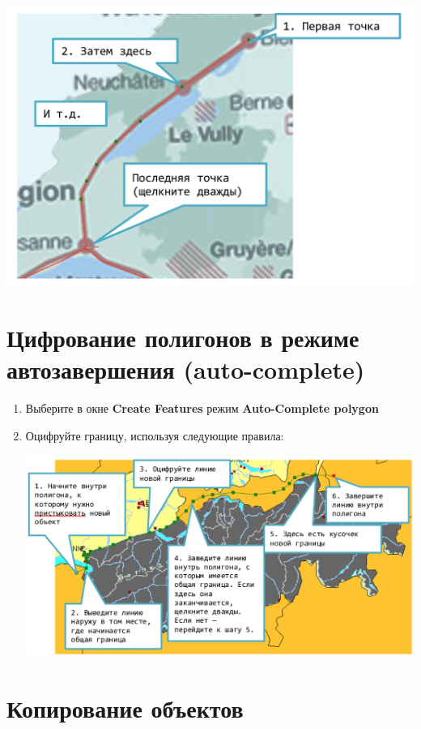 \documentclass[12pt,]{book}
\begin{document}
\begin{enumerate}
  \includegraphics{images/Appendix/image92.png}
\end{enumerate}

\hypertarget{manual-edit-complete}{%
\section{Цифрование полигонов в режиме автозавершения (auto-complete)}\label{manual-edit-complete}}

\begin{enumerate}
\def\labelenumi{\arabic{enumi}.}
\item
  Выберите в окне \textbf{Create Features} режим \textbf{Auto-Complete polygon}
\item
  Оцифруйте границу, используя следующие правила:

  \includegraphics{images/Appendix/image93.png}
\end{enumerate}

\hypertarget{manual-edit-copy}{%
\section{Копирование объектов}\label{manual-edit-copy}}
\end{document}

